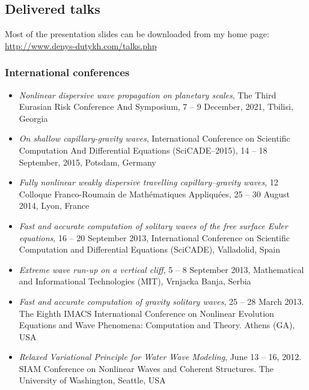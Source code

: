 \documentclass[final, a4paper, oneside, 12pt]{article}
\numberwithin{equation}{section}
\begin{document}
\subsection{Delivered talks}

Most of the presentation slides can be downloaded from my home page: \\
\url{http://www.denys-dutykh.com/talks.php}

\subsubsection{International conferences}

\begin{itemize}

  \item \textit{Nonlinear dispersive wave propagation on planetary scales}, The Third Eurasian Risk Conference And Symposium, 7 -- 9 December, 2021, Tbilisi, Georgia

  \item \textit{On shallow capillary-gravity waves}, International Conference on Scientific Computation And Differential Equations (SciCADE--2015), 14 -- 18 September, 2015, Potsdam, Germany

  \item \textit{Fully nonlinear weakly dispersive travelling capillary--gravity waves},  12 Colloque Franco-Roumain de Math\'ematiques Appliqu\'ees, 25 -- 30 August 2014, Lyon, France

  \item \textit{Fast and accurate computation of solitary waves of the free surface Euler equations}, 16 -- 20 September 2013, International Conference on Scientific Computation and Differential Equations (SciCADE), Valladolid, Spain

  \item \textit{Extreme wave run-up on a vertical cliff}, 5 -- 8 September 2013, Mathematical and Informational Technologies (MIT), Vrnjacka Banja, Serbia

  \item \textit{Fast and accurate computation of gravity solitary waves}, 25 -- 28 March 2013. The Eighth IMACS International Conference on Nonlinear Evolution Equations and Wave Phenomena: Computation and Theory. Athens (GA), USA

  \item \textit{Relaxed Variational Principle for Water Wave Modeling}, June 13 -- 16, 2012. SIAM Conference on Nonlinear Waves and Coherent Structures. The University of Washington, Seattle, USA


\end{itemize}
\end{document}
